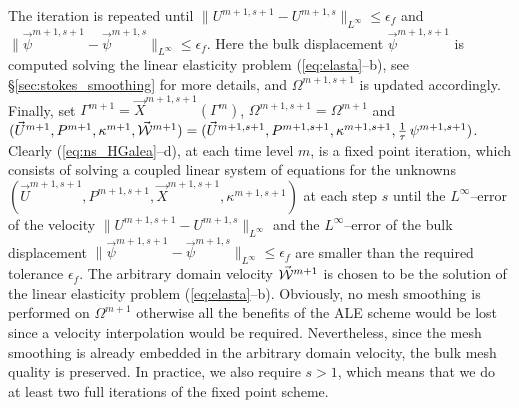 The iteration is repeated until $\|U^{m+1,s+1}-U^{m+1,s}\|_{L^\infty}
\leq\epsilon_f$ and $\|\vec \psi^{m+1,s+1}-\vec \psi^{m+1,s}\|_{L^\infty}
\leq\epsilon_f$. Here the bulk displacement $\vec \psi^{m+1,s+1}$ is computed
solving the linear elasticity problem (\ref{eq:elasta}--b), see
\S\ref{sec:stokes_smoothing} for more details, and $\Omega^{m+1,s+1}$ is
updated accordingly. Finally, set
${\Gamma^{m+1} = \vec X^{m+1,s+1}(\Gamma^m)}$, $\Omega^{m+1,s+1}=\Omega^{m+1}$
and $(\vec U^{m+1}, P^{m+1}, \kappa^{m+1},\vec{\mathcal W}^{m+1}) =
(\vec U^{m+1,s+1}, P^{m+1,s+1},\kappa^{m+1,s+1},\tfrac1\tau\,\psi^{m+1,s+1})$.
Clearly (\ref{eq:ns_HGalea}--d), at each time level $m$, is
a fixed point iteration, which consists of solving a coupled linear system of
equations for the unknowns $(\vec U^{m+1,s+1}, P^{m+1,s+1}, \vec X^{m+1,s+1},
\kappa^{m+1,s+1})$ at each step $s$ until the $L^\infty$--error of the
velocity $\|U^{m+1,s+1}-U^{m+1,s} \|_{L^\infty}$ and the $L^\infty$--error of
the bulk displacement $\|\vec \psi^{m+1,s+1}-\vec \psi^{m+1,s}\|_{L^\infty}
\leq\epsilon_f$ are smaller than the required tolerance $\epsilon_f$. The
arbitrary domain velocity $\vec{\mathcal W}^{m+1}$ is chosen to be the solution of the linear
elasticity problem (\ref{eq:elasta}--b). Obviously, no mesh smoothing is
performed on $\Omega^{m+1}$ otherwise all the benefits of the ALE scheme would
be lost since a velocity interpolation would be required. Nevertheless, since
the mesh smoothing is already embedded in the arbitrary domain velocity, the
bulk mesh quality is preserved. In practice, we also require $s>1$, which means
that we do at least two full iterations of the fixed point scheme.

